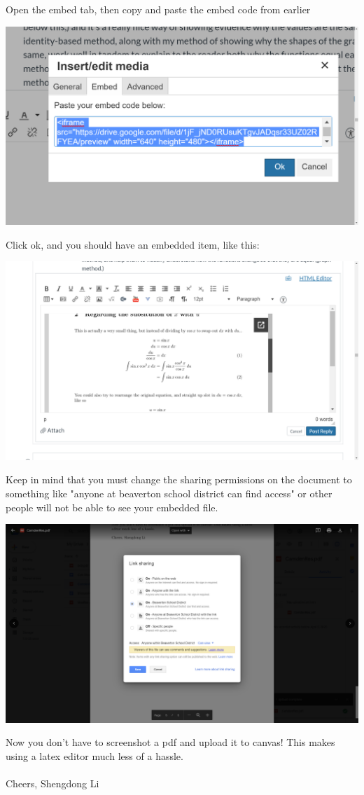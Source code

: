 \documentclass[letterpaper, 12pt]{article}
\begin{document}
Open the embed tab, then copy and paste the embed code from earlier
\begin{center}
    \includegraphics[scale=0.3]{7.png}
\end{center}
Click ok, and you should have an embedded item, like this:
\begin{center}
    \includegraphics[scale=0.3]{8.png}
\end{center}
Keep in mind that you must change the sharing permissions on the document to something like "anyone at beaverton school district can find access" or other people will not be able to see your embedded file.
\begin{center}
    \includegraphics[scale=0.3]{9.png}
\end{center}
Now you don't have to screenshot a pdf and upload it to canvas! This makes using a latex editor much less of a hassle.\\~\\
Cheers, Shengdong Li
\end{document}
